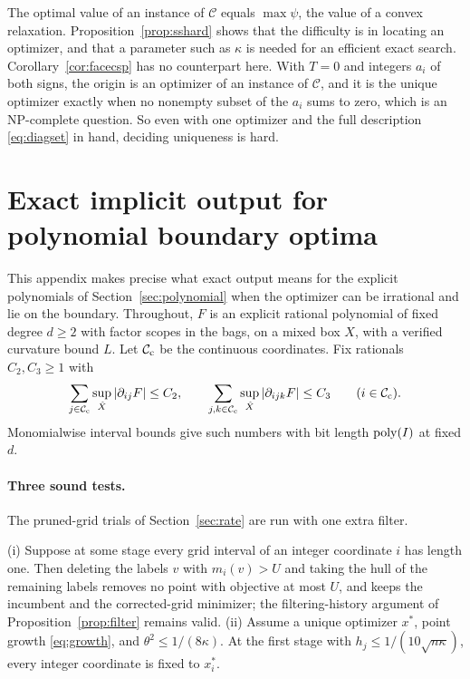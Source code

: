 The optimal value of an instance of $\mathcal C$ equals $\max\psi$, the value
of a convex relaxation. Proposition~\ref{prop:sshard} shows that the
difficulty is in locating an optimizer, and that a parameter such as $\kappa$
is needed for an efficient exact search. Corollary~\ref{cor:facecsp} has no
counterpart here. With $T=0$ and integers $a_i$ of both signs, the origin is an
optimizer of an instance of $\mathcal C$, and it is the unique optimizer
exactly when no nonempty subset of the $a_i$ sums to zero, which is an
NP-complete question. So even with one optimizer and the full description
\eqref{eq:diagset} in hand, deciding uniqueness is hard.

\section{Exact implicit output for polynomial boundary optima}\label{app:boundary}

This appendix makes precise what exact output means for the explicit
polynomials of Section~\ref{sec:polynomial} when the optimizer can be
irrational and lie on the boundary. Throughout, $F$ is an explicit rational
polynomial of fixed degree $d\ge2$ with factor scopes in the bags, on a mixed
box $X$, with a verified curvature bound $L$. Let $\mathcal C_{\rm c}$ be the
continuous coordinates. Fix rationals $C_2,C_3\ge1$ with
\[
\sum_{j\in\mathcal C_{\rm c}}\sup_{\hat X}|\partial_{ij}F|\le C_2,\qquad
\sum_{j,k\in\mathcal C_{\rm c}}\sup_{\hat X}|\partial_{ijk}F|\le C_3
\qquad(i\in\mathcal C_{\rm c}).
\]
Monomialwise interval bounds give such numbers with bit length $\operatorname{poly}(I)$
at fixed $d$.

\paragraph{Three sound tests.}
The pruned-grid trials of Section~\ref{sec:rate} are run with one extra filter.

\begin{lemma}\label{lem:labelfilter}
(i) Suppose at some stage every grid interval of an integer coordinate $i$
has length one. Then deleting the labels $v$ with $m_i(v)>U$ and taking the
hull of the remaining labels removes no point with objective at most $U$, and
keeps the incumbent and the corrected-grid minimizer; the filtering-history
argument of Proposition~\ref{prop:filter} remains valid.
(ii) Assume a unique optimizer $x^*$, point growth \eqref{eq:growth}, and
$\theta^2\le1/(8\kappa)$. At the first stage with
$h_j\le1/(10\sqrt{n\kappa})$, every integer coordinate is fixed to $x^*_i$.
\end{lemma}

